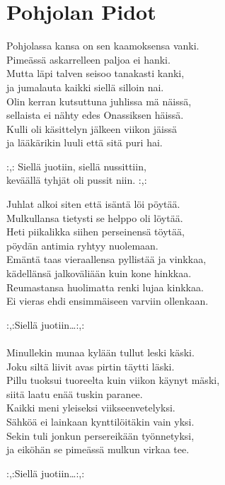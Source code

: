\section{Pohjolan Pidot}
Pohjolassa kansa on sen kaamoksensa vanki.\\
Pimeässä askarrelleen paljoa ei hanki.\\
Mutta läpi talven seisoo tanakasti kanki,\\
ja jumalauta kaikki siellä silloin nai.\\
Olin kerran kutsuttuna juhlissa mä näissä,\\
sellaista ei nähty edes Onassiksen häissä.\\
Kulli oli käsittelyn jälkeen viikon jäissä\\
ja lääkärikin luuli että sitä puri hai.

:,: Siellä juotiin, siellä nussittiin,\\
keväällä tyhjät oli pussit niin. :,:

Juhlat alkoi siten että isäntä löi pöytää.\\
Mulkullansa tietysti se helppo oli löytää.\\
Heti piikalikka siihen perseinensä töytää,\\
pöydän antimia ryhtyy nuolemaan.\\
Emäntä taas vieraallensa pyllistää ja vinkkaa,\\
kädellänsä jalkoväliään kuin kone hinkkaa.\\
Reumastansa huolimatta renki lujaa kinkkaa.\\
Ei vieras ehdi ensimmäiseen varviin ollenkaan.

:,:Siellä juotiin…:,:\\
\\
Minullekin munaa kylään tullut leski käski.\\
Joku siltä liivit avas pirtin täytti läski.\\
Pillu tuoksui tuoreelta kuin viikon käynyt mäski,\\
siitä laatu enää tuskin paranee.\\
Kaikki meni yleiseksi viikseenvetelyksi.\\
Sähköä ei lainkaan kynttilöitäkin vain yksi.\\
Sekin tuli jonkun persereikään työnnetyksi,\\
ja eiköhän se pimeässä mulkun virkaa tee.

:,:Siellä juotiin…:,: